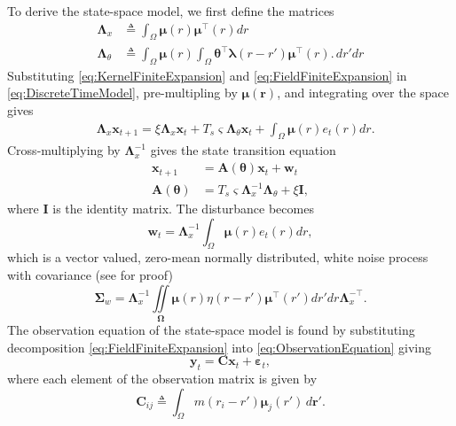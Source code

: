 \documentclass[journal]{IEEEtran}
\begin{document}
To derive the state-space model, we first define the matrices 
\begin{align}\label{eq:Lambdax}
 \mathbf{\Lambda}_{x} &\triangleq \int_{\Omega}\boldsymbol\mu\left(r\right)\boldsymbol\mu^\top\left(r\right) dr \\
\label{eq:Lambdatheta}
 \mathbf{\Lambda}_{\theta} &\triangleq \int_{\Omega}\boldsymbol\mu\left(r\right) \int_\Omega { 
	   \boldsymbol\theta^\top\boldsymbol\lambda\left(r-r'\right)
	    \boldsymbol\mu^\top\left(r\right). 
	\, dr'dr}
\end{align}
Substituting \eqref{eq:KernelFiniteExpansion} and \eqref{eq:FieldFiniteExpansion} in \eqref{eq:DiscreteTimeModel}, pre-multipling by $\boldsymbol\mu\left(\mathbf r\right)$, and integrating over the space gives
\begin{align}\label{eq:DecomposedModel2} 
	&\mathbf{\Lambda}_{x} \mathbf{x}_{t+1}= 
	\xi\mathbf{\Lambda}_{x} \mathbf{x}_t +T_s \varsigma \mathbf{\Lambda}_{\theta}\mathbf{x}_t +\int_{\Omega}\boldsymbol\mu\left(r\right)e_t\left(r\right)dr.
\end{align}
Cross-multiplying by $\mathbf{\Lambda}_{x}^{-1}$ gives the state transition equation
\begin{align}\label{eq:StateEquation}
 \mathbf x_{t+1} &=\mathbf A(\boldsymbol \theta) \mathbf x_t+ \mathbf w_t\\
\label{eq:A_theta}
 \mathbf A(\boldsymbol \theta) &= T_s\varsigma\mathbf{\Lambda}_{x}^{-1}\mathbf{\Lambda}_{\theta}+\xi\mathbf I,
\end{align}
where $\mathbf I$ is the identity matrix. The disturbance becomes 
\begin{equation}\label{eq:Disturbance}
\mathbf w_t= \mathbf{\Lambda}_{x}^{-1}\int_{\Omega}\boldsymbol\mu \left(r\right)e_t\left(r\right)dr,
\end{equation}
which is a vector valued, zero-mean normally distributed, white noise process with covariance (see \cite{Freestone2011} for proof)
\begin{equation}
\boldsymbol\Sigma_w =\mathbf{\Lambda}_{x}^{-1}\iint\limits_{\boldsymbol\Omega}\boldsymbol\mu\left(r\right) \eta\left(r-r'\right)\boldsymbol\mu^{\top}\left(r'\right)dr'dr\mathbf{\Lambda}_{x}^{-\top}.
\end{equation}
The observation equation of the state-space model is found by substituting decomposition \eqref{eq:FieldFiniteExpansion}
 into \eqref{eq:ObservationEquation} giving
\begin{equation}\label{eq:ReducedObservationEquation} 
	\mathbf{y}_t = \mathbf{C}\mathbf{x}_t + \boldsymbol{\varepsilon}_t,
\end{equation}
where each element of the observation matrix is given by
\begin{equation}\label{eq:Observationmatrix}
	\mathbf{C}_{ij} \triangleq \int_{\Omega}m(r_i - r')\boldsymbol{\mu}_j(r') \, d\mathbf{r}'.
\end{equation}
\end{document}
